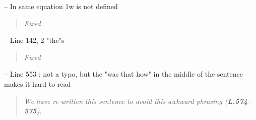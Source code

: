 \documentclass[11pt]{article}
\begin{document}
\noindent-- In same equation 1w is not defined
\begin{quote}
	{\itshape Fixed}
\end{quote}

\noindent-- Line 142, 2 "the"s
\begin{quote}
	{\itshape Fixed}
\end{quote}

\noindent-- Line 553 : not a typo, but the "was that how" in the middle of the sentence makes it hard to read
\begin{quote}
	{\itshape We have re-written this sentence to avoid this awkward phrasing ({\bf L.574--575}).}
\end{quote}
\end{document}
